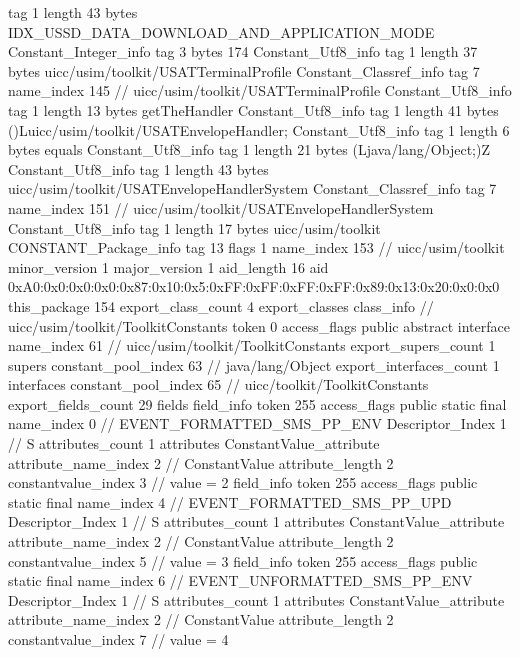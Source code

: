 {{{			tag	1
			length	43
			bytes	IDX_USSD_DATA_DOWNLOAD_AND_APPLICATION_MODE
		}
		Constant_Integer_info {
			tag	3
			bytes	174
		}
		Constant_Utf8_info {
			tag	1
			length	37
			bytes	uicc/usim/toolkit/USATTerminalProfile
		}
		Constant_Classref_info {
			tag	7
			name_index	145		// uicc/usim/toolkit/USATTerminalProfile
		}
		Constant_Utf8_info {
			tag	1
			length	13
			bytes	getTheHandler
		}
		Constant_Utf8_info {
			tag	1
			length	41
			bytes	()Luicc/usim/toolkit/USATEnvelopeHandler;
		}
		Constant_Utf8_info {
			tag	1
			length	6
			bytes	equals
		}
		Constant_Utf8_info {
			tag	1
			length	21
			bytes	(Ljava/lang/Object;)Z
		}
		Constant_Utf8_info {
			tag	1
			length	43
			bytes	uicc/usim/toolkit/USATEnvelopeHandlerSystem
		}
		Constant_Classref_info {
			tag	7
			name_index	151		// uicc/usim/toolkit/USATEnvelopeHandlerSystem
		}
		Constant_Utf8_info {
			tag	1
			length	17
			bytes	uicc/usim/toolkit
		}
		CONSTANT_Package_info {
			tag	13
			flags	1
			name_index	153		// uicc/usim/toolkit
			minor_version	1
			major_version	1
			aid_length	16
			aid	0xA0:0x0:0x0:0x0:0x87:0x10:0x5:0xFF:0xFF:0xFF:0xFF:0x89:0x13:0x20:0x0:0x0
		}
	}
	this_package	154
	export_class_count	4
	export_classes {
		class_info {		// uicc/usim/toolkit/ToolkitConstants
			token	0
			access_flags	public abstract interface
			name_index	61		// uicc/usim/toolkit/ToolkitConstants
			export_supers_count	1
			supers {
				constant_pool_index	63		// java/lang/Object
			}
			export_interfaces_count	1
			interfaces {
				constant_pool_index	65		// uicc/toolkit/ToolkitConstants
			}
			export_fields_count	29
			fields {
			field_info {
				token	255
				access_flags	public static final
				name_index	0		// EVENT_FORMATTED_SMS_PP_ENV
				Descriptor_Index	1		// S
				attributes_count	1
				attributes {
				ConstantValue_attribute {
					attribute_name_index	2		// ConstantValue
					attribute_length	2
					constantvalue_index	3		// value = 2
				}
				}
			}
			field_info {
				token	255
				access_flags	public static final
				name_index	4		// EVENT_FORMATTED_SMS_PP_UPD
				Descriptor_Index	1		// S
				attributes_count	1
				attributes {
				ConstantValue_attribute {
					attribute_name_index	2		// ConstantValue
					attribute_length	2
					constantvalue_index	5		// value = 3
				}
				}
			}
			field_info {
				token	255
				access_flags	public static final
				name_index	6		// EVENT_UNFORMATTED_SMS_PP_ENV
				Descriptor_Index	1		// S
				attributes_count	1
				attributes {
				ConstantValue_attribute {
					attribute_name_index	2		// ConstantValue
					attribute_length	2
					constantvalue_index	7		// value = 4
}}}}}}}
